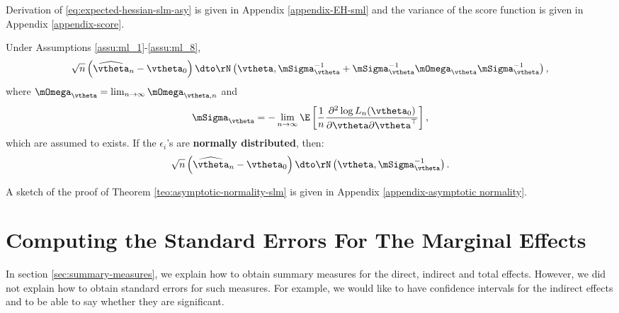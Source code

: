 \documentclass[english,12pt]{book}\usepackage[]{graphicx}\usepackage[]{xcolor}
\begin{document}
Derivation of \eqref{eq:expected-hessian-slm-asy} is given in Appendix \ref{appendix-EH-sml} and the variance of the score function is given in Appendix \ref{appendix-score}.


\begin{theorem}\label{teo:asymptotic-normality-slm}
Under Assumptions \ref{assu:ml_1}-\ref{assu:ml_8}, 
\begin{equation}
  \sqrt{n}\left(\widehat{\vtheta}_n- \vtheta_0\right)\dto \rN\left(\vtheta, \mSigma_{\vtheta}^{-1} + \mSigma_{\vtheta}^{-1}\mOmega_{\vtheta}\mSigma_{\vtheta}^{-1}\right),
\end{equation}
%
where $\mOmega_{\vtheta} = \lim_{n\to\infty}\mOmega_{\vtheta, n}$ and
\begin{equation}
  \mSigma_{\vtheta}= - \lim_{n\to\infty} \E\left[\frac{1}{n}\frac{\partial^2 \log L_n(\vtheta_0)}{\partial \vtheta \partial \vtheta^\top}\right],
\end{equation}
which are assumed to exists. If the $\epsilon_i$'s are \textbf{normally distributed}, then:
\begin{equation}
  \sqrt{n}\left(\widehat{\vtheta}_n- \vtheta_0\right)\dto \rN\left(\vtheta, \mSigma_{\vtheta}^{-1}\right).
\end{equation}
\end{theorem}

A sketch of the proof of Theorem \ref{teo:asymptotic-normality-slm} is given in Appendix \ref{appendix-asymptotic normality}.

\section{Computing the Standard Errors For The Marginal Effects}

In section \ref{sec:summary-measures}, we explain how to obtain summary measures for the direct, indirect and total effects. However, we did not explain how to obtain standard errors for such measures. For example, we would like to have confidence intervals for the indirect effects and to be able to say whether they are significant. 
\end{document}
